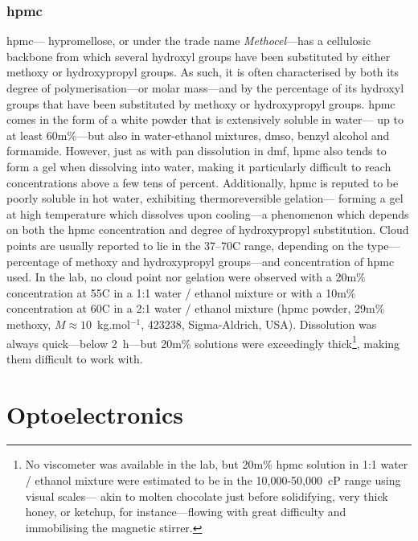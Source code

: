 \subsubsection{\texorpdfstring{\gls{hpmc}}{HPMC}}\label{subsect:thin_film:poly_hpmc}

\gls{hpmc}---\aka{} hypromellose, or under the trade name \textit{Methocel}---has a cellulosic backbone from which several hydroxyl groups have been substituted by either methoxy or hydroxypropyl groups\cite[Fig.~1]{li2005}. As such, it is often characterised by both its degree of polymerisation---or molar mass---and by the percentage of its hydroxyl groups that have been substituted by methoxy or hydroxypropyl groups\cite[Table~I]{archer1991}. \gls{hpmc} comes in the form of a white powder that is extensively soluble in water---\ie{} up to at least 60m\%\cite{pekel2004}---but also in water-ethanol mixtures\cite{fernandezramos2019}, \gls{dmso}, benzyl alcohol and formamide\cite{archer1991}. However, just as with \gls{pan} dissolution in \gls{dmf}, \gls{hpmc} also tends to form a gel when dissolving into water\cite{li2005}, making it particularly difficult to reach concentrations above a few tens of percent. Additionally, \gls{hpmc} is reputed to be poorly soluble in hot water, exhibiting thermoreversible gelation---\ie{} forming a gel at high temperature which dissolves upon cooling---a phenomenon which depends on both the \gls{hpmc} concentration and degree of hydroxypropyl substitution\cite{ford1999}. Cloud points are usually reported to lie in the 37--70{\degree}C range, depending on the type---\ie{} percentage of methoxy and hydroxypropyl groups---and concentration of \gls{hpmc} used. In the lab, no cloud point nor gelation were observed with a 20m\% concentration at 55{\degree}C in a 1:1 water / ethanol mixture or with a 10m\% concentration at 60{\degree}C in a 2:1 water / ethanol mixture (\gls{hpmc} powder, 29m\% methoxy, $M \approx 10$~kg.mol$^{-1}$, 423238, Sigma-Aldrich, USA). Dissolution was always quick---below 2~h---but 20m\% solutions were exceedingly thick\footnote{No viscometer was available in the lab, but 20m\% \gls{hpmc} solution in 1:1 water / ethanol mixture were estimated to be in the 10,000-50,000~cP range using visual scales---\ie{} akin to molten chocolate just before solidifying, very thick honey, or ketchup, for instance---flowing with great difficulty and immobilising the magnetic stirrer.}, making them difficult to work with.

\section{Optoelectronics}\label{sect:thin_film:opto_elec}

